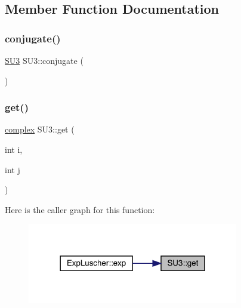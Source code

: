 \subsection{Member Function Documentation}
\mbox{\label{class_s_u3_a1db359a1ede38fcf858876292a8c9c43}} 
\subsubsection{\texorpdfstring{conjugate()}{conjugate()}}
{\footnotesize\ttfamily \mbox{\hyperlink{class_s_u3}{S\+U3}} S\+U3\+::conjugate (\begin{DoxyParamCaption}{ }\end{DoxyParamCaption})}

\mbox{\label{class_s_u3_aa0c34df7c067dcbb917d18cf587046a2}} 
\subsubsection{\texorpdfstring{get()}{get()}}
{\footnotesize\ttfamily \mbox{\hyperlink{classcomplex}{complex}} S\+U3\+::get (\begin{DoxyParamCaption}\item[{int}]{i,  }\item[{int}]{j }\end{DoxyParamCaption})\hspace{0.3cm}{\ttfamily [inline]}}

Here is the caller graph for this function\+:
\nopagebreak
\begin{figure}[H]
\begin{center}
\leavevmode
\includegraphics[width=261pt]{class_s_u3_aa0c34df7c067dcbb917d18cf587046a2_icgraph}
\end{center}
\end{figure}
\mbox{\label{class_s_u3_af84aef1d34a4fdcda292200804eb1221}} 
